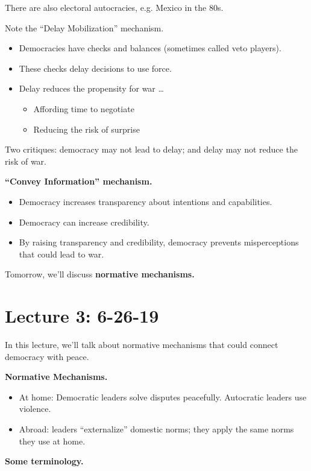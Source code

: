 \documentclass{article}
\begin{document}
There are also electoral autocracies, e.g. Mexico in the 80s.

Note the ``Delay Mobilization'' mechanism.

\begin{itemize}
  \item Democracies have checks and balances (sometimes called veto players).
  \item These checks delay decisions to use force.
  \item Delay reduces the propensity for war \ldots
    \begin{itemize}
      \item Affording time to negotiate
      \item Reducing the risk of surprise
    \end{itemize}
\end{itemize}

Two critiques: democracy may not lead to delay; and delay may not reduce the risk of war.

{\bf ``Convey Information'' mechanism.}

\begin{itemize}
  \item Democracy increases transparency about intentions and capabilities.
  \item Democracy can increase credibility. 
  \item By raising transparency and credibility, democracy prevents misperceptions that could lead to war.
\end{itemize}

Tomorrow, we'll discuss {\bf normative mechanisms.}

\section{Lecture 3: 6-26-19}

In this lecture, we'll talk about normative mechanisms that could connect democracy with peace.

{\bf Normative Mechanisms.}

\begin{itemize}
  \item At home: Democratic leaders solve disputes peacefully. Autocratic leaders use violence.
  \item Abroad: leaders ``externalize'' domestic norms; they apply the same norms they use at home.
\end{itemize}

{\bf Some terminology.}
\end{document}
